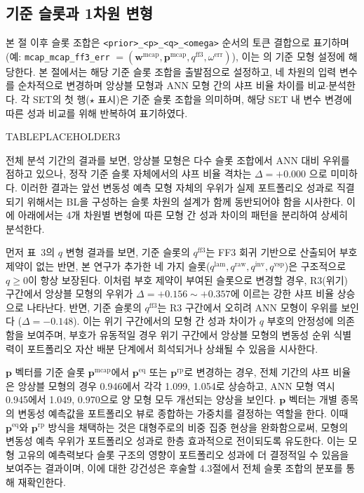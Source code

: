 \documentclass{article}
\begin{document}
\subsection{기준 슬롯과 1차원 변형}\label{subsec:baseline_slot}

본 절 이후 슬롯 조합은 \texttt{<prior>\_<p>\_<q>\_<omega>} 순서의 토큰 결합으로 표기하며 (예: \texttt{mcap\_mcap\_ff3\_err} $= (\mathbf{w}^{\mathrm{mcap}}, \mathbf{p}^{\mathrm{mcap}}, q^{\mathrm{ff3}}, \omega^{\mathrm{err}})$), 이는 \citet{pyo2018}의 기준 모형 설정에 해당한다. 본 절에서는 해당 기준 슬롯 조합을 출발점으로 설정하고, 네 차원의 입력 변수를 순차적으로 변경하며 앙상블 모형과 ANN 모형 간의 샤프 비율 차이를 비교$\cdot$분석한다. 각 SET의 첫 행($\star$ 표시)은 기준 슬롯 조합을 의미하며, 해당 SET 내 변수 변경에 따른 성과 비교를 위해 반복하여 표기하였다.



TABLEPLACEHOLDER3



전체 분석 기간의 결과를 보면, 앙상블 모형은 다수 슬롯 조합에서 ANN 대비 우위를 점하고 있으나, 정작 기준 슬롯 자체에서의 샤프 비율 격차는 $\Delta = +0.000$ 으로 미미하다. 이러한 결과는 앞선 변동성 예측 모형 자체의 우위가 실제 포트폴리오 성과로 직결되기 위해서는 BL을 구성하는 슬롯 차원의 설계가 함께 동반되어야 함을 시사한다. 이에 아래에서는 4개 차원별 변형에 따른 모형 간 성과 차이의 패턴을 분리하여 상세히 분석한다.

먼저 표~3의 $q$ 변형 결과를 보면, 기준 슬롯의 $q^{\mathrm{ff3}}$는 FF3 회귀 기반으로 산출되어 부호 제약이 없는 반면, 본 연구가 추가한 네 가지 슬롯($q^{\mathrm{lam}}, q^{\mathrm{raw}}, q^{\mathrm{inv}}, q^{\mathrm{vsp}}$)은 구조적으로 $q \geq 0$이 항상 보장된다. 이처럼 부호 제약이 부여된 슬롯으로 변경할 경우, R3(위기) 구간에서 앙상블 모형의 우위가 $\Delta = +0.156 \sim +0.357$에 이르는 강한 샤프 비율 상승으로 나타난다. 반면, 기준 슬롯의 $q^{\mathrm{ff3}}$는 R3 구간에서 오히려 ANN 모형이 우위를 보인다 ($\Delta = -0.148$). 이는 위기 구간에서의 모형 간 성과 차이가 $q$ 부호의 안정성에 의존함을 보여주며, 부호가 유동적일 경우 위기 구간에서 앙상블 모형의 변동성 순위 식별력이 포트폴리오 자산 배분 단계에서 희석되거나 상쇄될 수 있음을 시사한다.

$\mathbf{p}$ 벡터를 기준 슬롯 $\mathbf{p}^{\mathrm{mcap}}$에서 $\mathbf{p}^{\mathrm{eq}}$ 또는 $\mathbf{p}^{\mathrm{rp}}$로 변경하는 경우, 전체 기간의 샤프 비율은 앙상블 모형의 경우 0.946에서 각각 1.099, 1.054로 상승하고, ANN 모형 역시 0.945에서 1.049, 0.970으로 양 모형 모두 개선되는 양상을 보인다. $\mathbf{p}$ 벡터는 개별 종목의 변동성 예측값을 포트폴리오 뷰로 종합하는 가중치를 결정하는 역할을 한다. 이때 $\mathbf{p}^{\mathrm{eq}}$와 $\mathbf{p}^{\mathrm{rp}}$ 방식을 채택하는 것은 대형주로의 비중 집중 현상을 완화함으로써, 모형의 변동성 예측 우위가 포트폴리오 성과로 한층 효과적으로 전이되도록 유도한다. 이는 모형 고유의 예측력보다 슬롯 구조의 영향이 포트폴리오 성과에 더 결정적일 수 있음을 보여주는 결과이며, 이에 대한 강건성은 후술할  4.3절에서 전체 슬롯 조합의 분포를 통해 재확인한다. 
\end{document}
